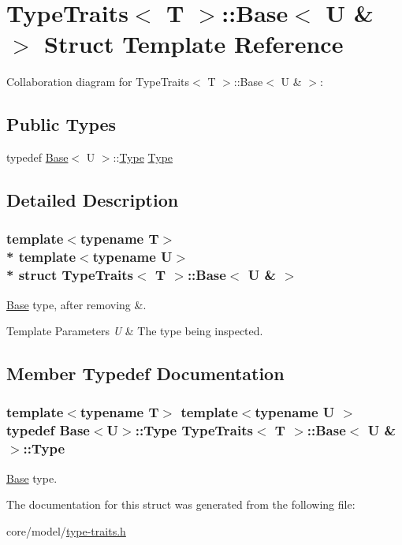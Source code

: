 \hypertarget{structTypeTraits_1_1Base_3_01U_01_6_01_4}{}\section{Type\+Traits$<$ T $>$\+:\+:Base$<$ U \& $>$ Struct Template Reference}
\label{structTypeTraits_1_1Base_3_01U_01_6_01_4}


Collaboration diagram for Type\+Traits$<$ T $>$\+:\+:Base$<$ U \& $>$\+:
\subsection*{Public Types}
\begin{DoxyCompactItemize}
\item 
typedef \hyperlink{structTypeTraits_1_1Base}{Base}$<$ U $>$\+::\hyperlink{structTypeTraits_1_1Base_3_01U_01_6_01_4_a98a4a3171185aa21dde6c091da8617fe}{Type} \hyperlink{structTypeTraits_1_1Base_3_01U_01_6_01_4_a98a4a3171185aa21dde6c091da8617fe}{Type}
\end{DoxyCompactItemize}


\subsection{Detailed Description}
\subsubsection*{template$<$typename T$>$\\*
template$<$typename U$>$\\*
struct Type\+Traits$<$ T $>$\+::\+Base$<$ U \& $>$}

\hyperlink{structTypeTraits_1_1Base}{Base} type, after removing {\ttfamily \&}. 
\begin{DoxyTemplParams}{Template Parameters}
{\em U} & The type being inspected. \\
\hline
\end{DoxyTemplParams}


\subsection{Member Typedef Documentation}
\subsubsection[{\texorpdfstring{Type}{Type}}]{\setlength{\rightskip}{0pt plus 5cm}template$<$typename T$>$ template$<$typename U $>$ typedef {\bf Base}$<$U$>$\+::{\bf Type} {\bf Type\+Traits}$<$ T $>$\+::{\bf Base}$<$ U \& $>$\+::{\bf Type}}\hypertarget{structTypeTraits_1_1Base_3_01U_01_6_01_4_a98a4a3171185aa21dde6c091da8617fe}{}\label{structTypeTraits_1_1Base_3_01U_01_6_01_4_a98a4a3171185aa21dde6c091da8617fe}
\hyperlink{structTypeTraits_1_1Base}{Base} type. 

The documentation for this struct was generated from the following file\+:\begin{DoxyCompactItemize}
\item 
core/model/\hyperlink{type-traits_8h}{type-\/traits.\+h}\end{DoxyCompactItemize}
